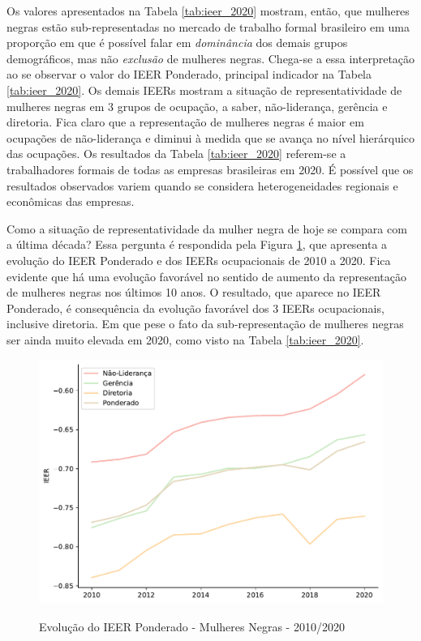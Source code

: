 \documentclass[12pt]{article}
\begin{document}
\par Os valores apresentados na Tabela \ref{tab:ieer_2020} mostram, então, que mulheres negras estão sub-representadas no mercado de trabalho formal brasileiro em uma proporção em que é possível falar em \textit{dominância} dos demais grupos de\-mo\-grá\-fi\-cos, mas não \textit{exclusão} de mulheres negras. Chega-se a essa interpretação ao se observar o valor do IEER Ponderado, principal indicador na Tabela \ref{tab:ieer_2020}. Os demais IEERs mostram a situação de representatividade de mulheres negras em 3 grupos de ocupação, a saber, não-liderança, gerência e diretoria. Fica claro que a representação de mulheres negras é maior em ocupações de não-liderança e diminui à medida que se avança no nível hierárquico das ocupações. Os resultados da Tabela \ref{tab:ieer_2020} referem-se a trabalhadores formais de todas as empresas brasileiras em 2020. É possível que os resultados observados variem quando se considera heterogeneidades regionais e econômicas das empresas.



\par Como a situação de representatividade da mulher negra de hoje se compara com a última década? Essa pergunta é respondida pela Figura \ref{fig:ieer_evolution}, que apresenta a evolução do IEER Ponderado e dos IEERs ocupacionais de 2010 a 2020. Fica evidente que há uma evolução favorável no sentido de aumento da representação de mulheres negras nos últimos 10 anos. O resultado, que aparece no IEER Ponderado, é consequência da evolução favorável dos 3 IEERs ocupacionais, inclusive diretoria. Em que pese o fato da sub-representação de mulheres negras ser ainda muito elevada em 2020, como visto na Tabela \ref{tab:ieer_2020}.

\begin{figure}[H]
    \centering
    \caption{Evolução do IEER Ponderado - Mulheres Negras - 2010/2020}
        \includegraphics[height=8cm]{../figures/ieer_black_women.pdf}
    \label{fig:ieer_evolution}
\end{figure}
\end{document}
